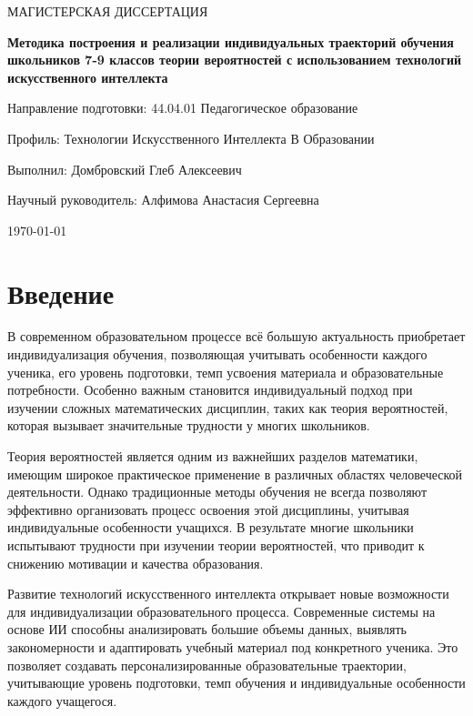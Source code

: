 \documentclass[a4paper,14pt]{extreport}
\begin{document}
\begin{titlepage}
    \centering
    \vspace*{1cm}
    {\Large МАГИСТЕРСКАЯ ДИССЕРТАЦИЯ\par}
    \vspace{1.5cm}
    {\LARGE\bfseries Методика построения и реализации индивидуальных траекторий обучения школьников 7-9 классов теории вероятностей с использованием технологий искусственного интеллекта\par}
    \vspace{3cm}
    {\Large Направление подготовки: 44.04.01 Педагогическое образование\par}
    \vspace{0.5cm}
    {\Large Профиль: Технологии Искусственного Интеллекта В Образовании}
    \vfill
    {\large Выполнил: Домбровский Глеб Алексеевич\par}
    {\large Научный руководитель: Алфимова Анастасия Сергеевна\par}
    \vspace{1cm}
    {\large \today\par}
\end{titlepage}

\tableofcontents
\newpage

\chapter*{Введение}

В современном образовательном процессе всё большую актуальность приобретает индивидуализация обучения, позволяющая учитывать особенности каждого ученика, его уровень подготовки, темп усвоения материала и образовательные потребности. Особенно важным становится индивидуальный подход при изучении сложных математических дисциплин, таких как теория вероятностей, которая вызывает значительные трудности у многих школьников.

Теория вероятностей является одним из важнейших разделов математики, имеющим широкое практическое применение в различных областях человеческой деятельности. Однако традиционные методы обучения не всегда позволяют эффективно организовать процесс освоения этой дисциплины, учитывая индивидуальные особенности учащихся. В результате многие школьники испытывают трудности при изучении теории вероятностей, что приводит к снижению мотивации и качества образования.

Развитие технологий искусственного интеллекта открывает новые возможности для индивидуализации образовательного процесса. Современные системы на основе ИИ способны анализировать большие объемы данных, выявлять закономерности и адаптировать учебный материал под конкретного ученика. Это позволяет создавать персонализированные образовательные траектории, учитывающие уровень подготовки, темп обучения и индивидуальные особенности каждого учащегося.
\end{document}
